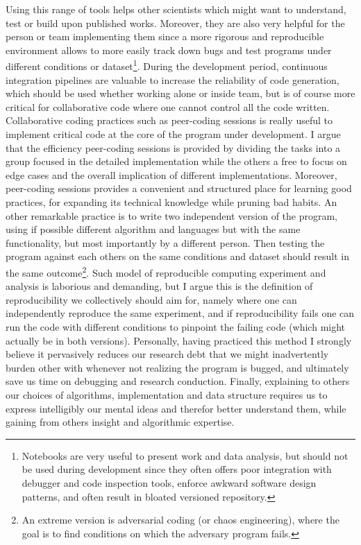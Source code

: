 Using this range of tools helps other scientists which might want to understand, test or build upon published works. 
Moreover, they are also very helpful for the person or team implementing them since a more rigorous and reproducible environment allows to more easily track down bugs and test programs under different conditions or dataset\footnote{Notebooks are very useful to present work and data analysis, but should not be used during development since they often offers poor integration with debugger and code inspection tools, enforce awkward software design patterns, and often result in bloated versioned repository.}. 
During the development period, continuous integration pipelines are valuable to increase the reliability of code generation, which should be used whether working alone or inside team, but is of course more critical for collaborative code where one cannot control all the code written.
Collaborative coding practices such as peer-coding sessions is really useful to implement critical code at the core of the program under development.
I argue that the efficiency peer-coding sessions is provided by dividing the tasks into a group focused in the detailed implementation while the others a free to focus on edge cases and the overall implication of different implementations. 
Moreover, peer-coding sessions provides a convenient and structured place for learning good practices, for expanding its technical knowledge while pruning bad habits.
An other remarkable practice is to write two independent version of the program, using if possible different algorithm and languages but with the same functionality, but most importantly by a different person.
Then testing the program against each others on the same conditions and dataset should result in the same outcome\footnote{An extreme version is adversarial coding (or chaos engineering), where the goal is to find conditions on which the adversary program fails.}.
Such model of reproducible computing experiment and analysis is laborious and demanding, but I argue this is the definition of reproducibility we collectively should aim for, namely where one can independently reproduce the same experiment, and if reproducibility fails one can run the code with different conditions to pinpoint the failing code (which might actually be in both versions).
Personally, having practiced this method I strongly believe it pervasively reduces our research debt that we might inadvertently burden other with whenever not realizing the program is bugged, and ultimately save us time on debugging and research conduction.
Finally, explaining to others our choices of algorithms, implementation and data structure requires us to express intelligibly our mental ideas and therefor better understand them, while gaining from others insight and algorithmic expertise.

